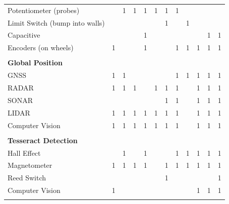\documentclass[12pt]{article}
\begin{document}
\begin{table}[H]
\begin{tabular}{p{15.645em}|c|c|c|c|c|c|c|c|c|c|c}
    Potentiometer (probes) &       & 1     & 1     & 1     & 1     & 1     & 1     &       &       &       &  \\
    Limit Switch (bump into walls) &       &       &       &       &       & 1     &       & 1     &       &       &  \\
    Capacitive &       &       &       & 1     &       &       &       &       &       & 1     & 1 \\
    Encoders (on wheels) & 1     &       &       & 1     &       &       & 1     & 1     & 1     & 1     & 1 \\
    \multicolumn{1}{r|}{} &       &       &       &       &       &       &       &       &       &       &  \\
    \midrule
    \textbf{Global Position} &       &       &       &       &       &       &       &       &       &       &  \\
\rowcolor{green}    GNSS  & 1     & 1     &       &       &       &       & 1     & 1     & 1     & 1     & 1 \\
    RADAR & 1     & 1     & 1     &       & 1     & 1     & 1     &       & 1     & 1     & 1 \\
    SONAR &       &       &       &       &       & 1     & 1     &       & 1     & 1     & 1 \\
\rowcolor{green}    LIDAR & 1     & 1     & 1     & 1     & 1     & 1     & 1     &       & 1     & 1     & 1 \\
    Computer Vision & 1     & 1     & 1     & 1     & 1     & 1     & 1     &       & 1     & 1     & 1 \\
    \multicolumn{1}{r|}{} &       &       &       &       &       &       &       &       &       &       &  \\
    \midrule
    \textbf{Tesseract Detection} &       &       &       &       &       &       &       &       &       &       &  \\
    Hall Effect &       & 1     &       & 1     &       &       & 1     & 1     & 1     & 1     & 1 \\
\rowcolor{green}    Magnetometer & 1     & 1     & 1     & 1     &       & 1     & 1     & 1     & 1     & 1     & 1 \\
    Reed Switch &       &       &       &       &       & 1     &       &       &       &       & 1 \\
    Computer Vision & 1     &       &       &       &       &       &       &       & 1     & 1     & 1 \\
    \multicolumn{1}{r|}{} &       &       &       &       &       &       &       &       &       &       &  \\

\end{tabular}
\end{table}
\end{document}
